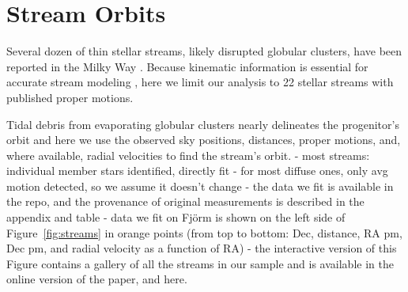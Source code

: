 \documentclass[twocolumn]{aastex63}
\newcommand{\package}[1]{\textsl{#1}}
\begin{document}
\section{Stream Orbits}
\label{sec:orbits}

Several dozen of thin stellar streams, likely disrupted globular clusters, have been reported in the Milky Way \citep[an up-to-date list is available in the \package{galstreams} package,][]{mateu:2018}.
Because kinematic information is essential for accurate stream modeling \citep{bh:2018}, here we limit our analysis to 22 stellar streams with published proper motions.

Tidal debris from evaporating globular clusters nearly delineates the progenitor's orbit \citep[e.g.,][]{kupper:2012} and here we use the observed sky positions, distances, proper motions, and, where available, radial velocities to find the stream's orbit.
- most streams: individual member stars identified, directly fit
- for most diffuse ones, only avg motion detected, so we assume it doesn't change
- the data we fit is available in the repo, and the provenance of original measurements is described in the appendix and table
- data we fit on Fj\" orm is shown on the left side of Figure~\ref{fig:streams} in orange points (from top to bottom: Dec, distance, RA pm, Dec pm, and radial velocity as a function of RA)
- the interactive version of this Figure contains a gallery of all the streams in our sample and is available in the online version of the paper, and here.

\end{document}
